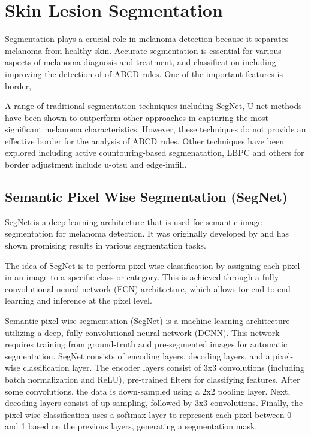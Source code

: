 \section{Skin Lesion Segmentation}
Segmentation plays a crucial role in melanoma detection because it separates melanoma from healthy skin. Accurate segmentation is essential for various aspects of melanoma diagnosis and treatment, and classification\cite{Albahli2020} including improving the detection of of ABCD rules\cite{Lee2020}. One of the important features is border, 

A range of traditional segmentation techniques including SegNet, U-net methods have been shown to outperform other approaches in capturing the most significant melanoma characteristics. However, these techniques do not provide an effective border for the analysis of ABCD rules. Other techniques have been explored including active countouring-based segmenatation\cite{Riaz2019}, LBPC and others for border adjustment include u-otsu and edge-imfill.


\subsection{Semantic Pixel Wise Segmentation (SegNet)}
SegNet is a deep learning architecture that is used for semantic image segmentation for melanoma detection. It was originally developed by\cite{chen2018} and has shown promising results in various segmentation tasks.

The idea of SegNet is to perform pixel-wise classification by assigning each pixel in an image to a specific class or category. This is achieved through a fully convolutional neural network (FCN) architecture, which allows for end to end learning and inference at the pixel level. 

Semantic pixel-wise segmentation (SegNet) is a machine learning architecture utilizing a deep, fully convolutional neural network (DCNN). This network requires training from ground-truth and pre-segmented images for automatic segmentation. SegNet consists of encoding layers, decoding layers, and a pixel-wise classification layer. The encoder layers consist of 3x3 convolutions (including batch normalization and ReLU), pre-trained filters for classifying features. After some convolutions, the data is down-sampled using a 2x2 pooling layer. Next, decoding layers consist of up-sampling, followed by 3x3 convolutions. Finally, the pixel-wise classification uses a softmax layer to represent each pixel between 0 and 1 based on the previous layers, generating a segmentation mask.

